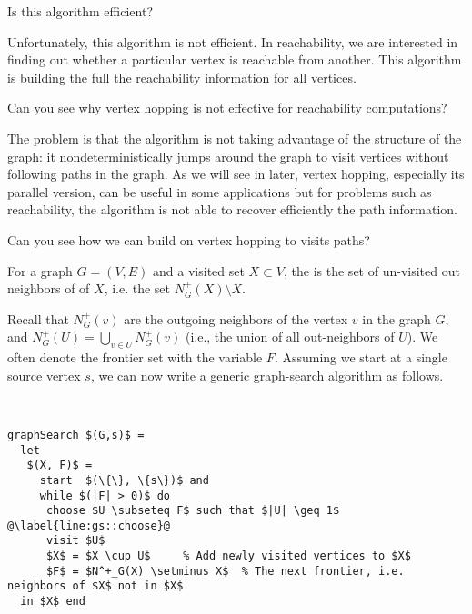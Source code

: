 \begin{notesonly}
\begin{question}
Is this algorithm efficient? 
\end{question}
%
Unfortunately, this algorithm is not efficient.  In reachability, we
are interested in finding out whether a particular vertex is reachable
from another. This algorithm is building the full the reachability
information for all vertices.
%
\begin{question}
Can you see why vertex hopping is not effective for reachability
computations?  
\end{question}
%

The problem is that the algorithm is not taking advantage of the
structure of the graph: it nondeterministically jumps around the graph
to visit vertices without following paths in the graph.  As we will
see in later, vertex hopping, especially its parallel version, can be
useful in some applications but for problems such as reachability, the
algorithm is not able to recover efficiently the path information.

\end{notesonly}

%
\begin{question}
Can you see how we can build on vertex hopping to visits paths?  
\end{question}
%
%
\begin{definition}
For a graph $G = (V,E)$ and a visited set $X \subset V$, the
 is the set of un-visited out neighbors of 
of $X$, i.e. the set $N^+_G(X) \setminus X$.
\end{definition}
Recall that $N^+_G(v)$ are the outgoing neighbors of  
the vertex $v$ in the graph $G$, and $N^+_G(U) = \bigcup_{v \in U} 
N^+_G(v)$ (i.e., the union of all out-neighbors of $U$).
 We often denote the frontier set with the variable $F$.
%
Assuming we start at a single source vertex $s$,
we can now write a generic graph-search algorithm as follows.
%
\begin{algorithm}~
\label{alg:graph-search::graph-search}
\begin{lstlisting}
graphSearch $(G,s)$ =
  let
   $(X, F)$ = 
     start  $(\{\}, \{s\})$ and
     while $(|F| > 0)$ do
      choose $U \subseteq F$ such that $|U| \geq 1$ @\label{line:gs::choose}@
      visit $U$
      $X$ = $X \cup U$     % Add newly visited vertices to $X$   
      $F$ = $N^+_G(X) \setminus X$  % The next frontier, i.e. neighbors of $X$ not in $X$
  in $X$ end
\end{lstlisting}
\end{algorithm}

